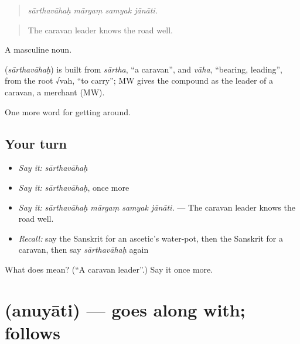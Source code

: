 \begin{quote}
   
\end{quote}

\begin{quote}
\emph{sārthavāhaḥ mārgaṃ samyak jānāti.}
\end{quote}

\begin{quote}
The caravan leader knows the road well.
\end{quote}

A masculine noun.

\begin{cousinweb}
\textbf{} (\emph{sārthavāhaḥ}) is built from \emph{sārtha}, \textquotedblleft{}a caravan\textquotedblright{}, and \emph{vāha}, \textquotedblleft{}bearing, leading\textquotedblright{}, from the root √vah, \textquotedblleft{}to carry\textquotedblright{}; MW gives the compound as the leader of a caravan, a merchant (MW).
\end{cousinweb}

\begin{grammarlens}[title={What you've built}]
One more word for getting around.
\end{grammarlens}

\subsection*{Your turn}
\begin{itemize}
\raggedright
  \item \emph{Say it:} \emph{sārthavāhaḥ}
  \item \emph{Say it:} \emph{sārthavāhaḥ}, once more
  \item \emph{Say it:} \emph{sārthavāhaḥ mārgaṃ samyak jānāti.} — The caravan leader knows the road well.
  \item \emph{Recall:} say the Sanskrit for an ascetic's water-pot, then the Sanskrit for a caravan, then say \emph{sārthavāhaḥ} again
\end{itemize}

\begin{tcolorbox}[breakable,colback=teal!4,colframe=teal!35!black,title={Before you move on}]
What does  mean? (\textquotedblleft{}A caravan leader\textquotedblright{}.) Say it once more.
\end{tcolorbox}
\section[\texorpdfstring{\sk{अनुयाति} (anuyāti)}{अनुयाति (anuyāti)}]{ (anuyāti) — goes along with; follows}

